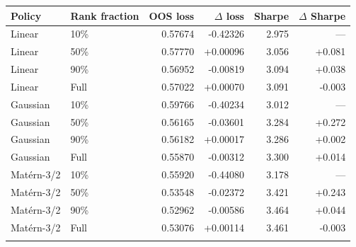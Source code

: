 \begin{tabular}{llrrrr}
\toprule
Policy & Rank fraction & OOS loss & $\Delta$ loss & Sharpe & $\Delta$ Sharpe \\
\midrule
Linear & 10\% & 0.57674 & -0.42326 & 2.975 & --- \\
Linear & 50\% & 0.57770 & +0.00096 & 3.056 & +0.081 \\
Linear & 90\% & 0.56952 & -0.00819 & 3.094 & +0.038 \\
Linear & Full & 0.57022 & +0.00070 & 3.091 & -0.003 \\
\addlinespace
Gaussian & 10\% & 0.59766 & -0.40234 & 3.012 & --- \\
Gaussian & 50\% & 0.56165 & -0.03601 & 3.284 & +0.272 \\
Gaussian & 90\% & 0.56182 & +0.00017 & 3.286 & +0.002 \\
Gaussian & Full & 0.55870 & -0.00312 & 3.300 & +0.014 \\
\addlinespace
Mat\'ern-3/2 & 10\% & 0.55920 & -0.44080 & 3.178 & --- \\
Mat\'ern-3/2 & 50\% & 0.53548 & -0.02372 & 3.421 & +0.243 \\
Mat\'ern-3/2 & 90\% & 0.52962 & -0.00586 & 3.464 & +0.044 \\
Mat\'ern-3/2 & Full & 0.53076 & +0.00114 & 3.461 & -0.003 \\
\addlinespace
\bottomrule
\end{tabular}

